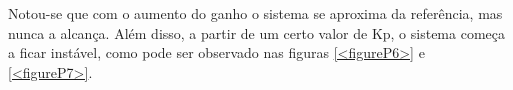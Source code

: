 \documentclass[a4paper,12pt]{article}
\begin{document}
\hspace{4ex}Notou-se que com o aumento do ganho o sistema se aproxima da referência, mas nunca a alcança. Além disso, a partir de um certo valor de Kp, o sistema começa a ficar instável, como pode ser observado nas figuras \ref{<figureP6>} e \ref{<figureP7>}.
\begin{figure}[H]
     \centering
     \hspace{4ex}
     \\
     \hspace{4ex}
     \\

\end{figure}
\end{document}
